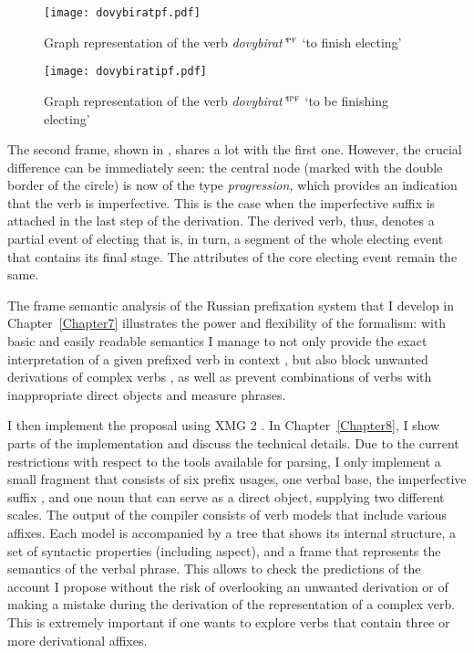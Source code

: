 \begin{figure}[p]
\texttt{[image: dovybiratpf.pdf]}
\caption{Graph representation of the verb \textit{dovybirat'}$^{\textsc{pf}}$ `to finish electing'\label{graph:pf}}
\end{figure}

\begin{figure}[p]
\texttt{[image: dovybiratipf.pdf]}
\caption{Graph representation of the verb \textit{dovybirat'}$^{\textsc{ipf}}$ `to be finishing electing'\label{graph:ipf}}
\end{figure}

The second frame, shown in , shares a lot with the first one. However, the crucial difference can be immediately seen: the central node (marked with the double border of the circle) is now of the type \textit{progression,} which provides an indication that the verb is imperfective. This is the case when the imperfective suffix   is attached in the last step of the derivation. The derived verb, thus, denotes a partial event of electing that is, in turn, a segment of the whole electing event that contains its final stage. The attributes of the core electing event remain the same.

The frame semantic analysis of the Russian prefixation  system that I develop in Chapter~\ref{Chapter7} illustrates the power and flexibility of the formalism: with basic and easily readable semantics I manage to not only provide the exact interpretation of a given prefixed verb in context  , but also block unwanted derivations of complex verbs , as well as prevent combinations of verbs with inappropriate direct objects and measure phrases.

I then implement the proposal using XMG 2 \citep{Petitjean:16}. In Chapter~\ref{Chapter8}, I show parts of the implementation and discuss the technical details. Due to the current restrictions with respect to the tools available for parsing, I only implement a small fragment that consists of six prefix usages, one verbal base, the imperfective suffix  , and one noun that can serve as a direct object, supplying two different scales. The output of the compiler consists of verb models that include various affixes. Each model is accompanied by a tree that shows its internal structure, a set of syntactic properties (including aspect), and a frame that represents the  semantics of the verbal phrase. This allows to check the predictions of the account I propose without the risk of overlooking an unwanted derivation or of making a mistake during the derivation of the representation of a complex verb. This is extremely important if one wants to explore verbs that contain three or more derivational affixes.

